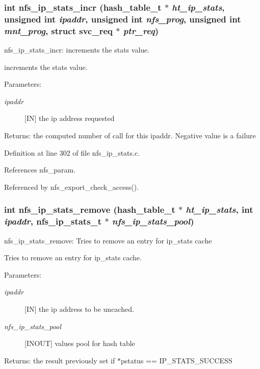 \subsubsection{\setlength{\rightskip}{0pt plus 5cm}int nfs\_\-ip\_\-stats\_\-incr (hash\_\-table\_\-t $\ast$ {\em ht\_\-ip\_\-stats}, unsigned int {\em ipaddr}, unsigned int {\em nfs\_\-prog}, unsigned int {\em mnt\_\-prog}, struct svc\_\-req $\ast$ {\em ptr\_\-req})}\label{nfs__ip__stats_8c_a7}


nfs\_\-ip\_\-stats\_\-incr: increments the stats value.

increments the stats value.

\begin{Desc}
\item[Parameters:]
\begin{description}
\item[{\em ipaddr}][IN] the ip address requested\end{description}
\end{Desc}
\begin{Desc}
\item[Returns:]the computed number of call for this ipaddr. Negative value is a failure \end{Desc}


Definition at line 302 of file nfs\_\-ip\_\-stats.c.

References nfs\_\-param.

Referenced by nfs\_\-export\_\-check\_\-access().
\subsubsection{\setlength{\rightskip}{0pt plus 5cm}int nfs\_\-ip\_\-stats\_\-remove (hash\_\-table\_\-t $\ast$ {\em ht\_\-ip\_\-stats}, int {\em ipaddr}, nfs\_\-ip\_\-stats\_\-t $\ast$ {\em nfs\_\-ip\_\-stats\_\-pool})}\label{nfs__ip__stats_8c_a9}


nfs\_\-ip\_\-stats\_\-remove: Tries to remove an entry for ip\_\-stats cache

Tries to remove an entry for ip\_\-stats cache.

\begin{Desc}
\item[Parameters:]
\begin{description}
\item[{\em ipaddr}][IN] the ip address to be uncached. \item[{\em nfs\_\-ip\_\-stats\_\-pool}][INOUT] values pool for hash table\end{description}
\end{Desc}
\begin{Desc}
\item[Returns:]the result previously set if $\ast$pstatus == IP\_\-STATS\_\-SUCCESS \end{Desc}


